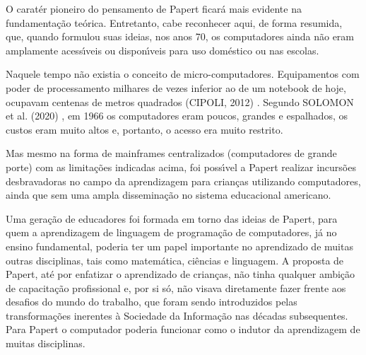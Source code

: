 \documentclass[
12pt,		%
openright,	%
twoside,  %
a4paper,			%
chapter=TITLE,		%
english,			%
french,				%
spanish,			%
brazil				%
]{USPSC-classe/USPSC}
\begin{document}
O carat\'er pioneiro do pensamento de Papert ficar\'a mais evidente na fundamenta\c{c}\~ao te\'orica. Entretanto, cabe reconhecer aqui, de forma resumida, que, quando formulou suas ideias, nos anos 70, os computadores  ainda n\~ao eram amplamente acess\'{\i}veis ou dispon\'{\i}veis para uso dom\'estico ou nas escolas.










Naquele tempo n\~ao existia o conceito de \textquotedbl micro-computadores\textquotedbl . Equipamentos com poder de processamento milhares de vezes inferior ao de um notebook de hoje, ocupavam centenas de metros quadrados  (CIPOLI, 2012) . Segundo  SOLOMON et al. (2020) , \textquotedbl em 1966 os computadores eram poucos, grandes e espalhados\textquotedbl , os custos eram muito altos e, portanto, o acesso era muito restrito.










Mas mesmo na forma de mainframes centralizados (computadores de grande porte) com as limita\c{c}\~oes indicadas acima, foi poss\'{\i}vel a Papert realizar incurs\~oes desbravadoras no campo da aprendizagem para crian\c{c}as utilizando computadores, ainda que sem uma ampla dissemina\c{c}\~ao no sistema educacional americano.










Uma gera\c{c}\~ao de educadores foi formada em torno das ideias de Papert, para quem a aprendizagem de linguagem de programa\c{c}\~ao de computadores, j\'a no ensino fundamental, poderia ter um papel importante no aprendizado de muitas outras disciplinas, tais como matem\'atica, ci\^encias e linguagem. A proposta de Papert, at\'e por enfatizar o aprendizado de crian\c{c}as, n\~ao tinha qualquer ambi\c{c}\~ao de capacita\c{c}\~ao profissional e, por si s\'o, n\~ao visava diretamente fazer frente aos desafios do \textquotedbl mundo do trabalho\textquotedbl , que foram sendo introduzidos pelas transforma\c{c}\~oes inerentes \`a Sociedade da Informa\c{c}\~ao nas d\'ecadas subsequentes. Para Papert o computador poderia funcionar como o indutor da aprendizagem de muitas disciplinas.
\end{document}
